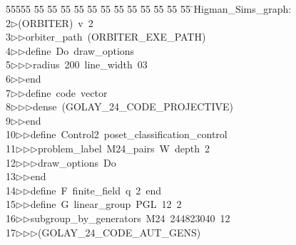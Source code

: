 %
%
\begin{tabbing}
55555 \= 55 \= 55 \= 55 \= 55 \= 55 \= 55 \= 55 \= 55 \= 55 \= 55 \= 55 \= 55 \= \>Higman\_Sims\_graph:\\[0pt]
2\>$\triangleright$\>(ORBITER)\ v\ 2\ \\[0pt]
3\>$\triangleright$\>$\triangleright$\>orbiter\_path\ (ORBITER\_EXE\_PATH)\ \\[0pt]
4\>$\triangleright$\>$\triangleright$\>define\ Do\ draw\_options\ \\[0pt]
5\>$\triangleright$\>$\triangleright$\>$\triangleright$\>radius\ 200\ line\_width\ 03\ \\[0pt]
6\>$\triangleright$\>$\triangleright$\>end\ \\[0pt]
7\>$\triangleright$\>$\triangleright$\>define\ code\ vector\ \\[0pt]
8\>$\triangleright$\>$\triangleright$\>$\triangleright$\>dense\ (GOLAY\_24\_CODE\_PROJECTIVE)\ \\[0pt]
9\>$\triangleright$\>$\triangleright$\>end\ \\[0pt]
10\>$\triangleright$\>$\triangleright$\>define\ Control2\ poset\_classification\_control\ \\[0pt]
11\>$\triangleright$\>$\triangleright$\>$\triangleright$\>problem\_label\ M24\_pairs\ W\ depth\ 2\ \\[0pt]
12\>$\triangleright$\>$\triangleright$\>$\triangleright$\>draw\_options\ Do\ \\[0pt]
13\>$\triangleright$\>$\triangleright$\>end\ \\[0pt]
14\>$\triangleright$\>$\triangleright$\>define\ F\ finite\_field\ q\ 2\ end\ \\[0pt]
15\>$\triangleright$\>$\triangleright$\>define\ G\ linear\_group\ PGL\ 12\ 2\ \\[0pt]
16\>$\triangleright$\>$\triangleright$\>subgroup\_by\_generators\ M24\ 244823040\ 12\ \\[0pt]
17\>$\triangleright$\>$\triangleright$\>$\triangleright$\>(GOLAY\_24\_CODE\_AUT\_GENS)\ \\[0pt]

\end{tabbing}
